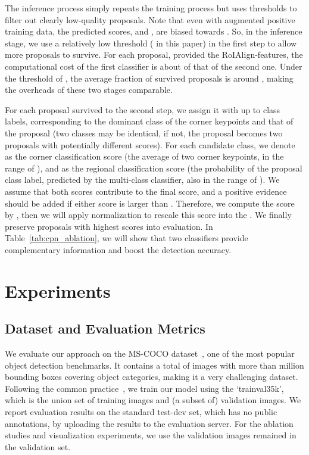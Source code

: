 \documentclass[runningheads]{llncs}
\begin{document}
The inference process simply repeats the training process but uses thresholds to filter out clearly low-quality proposals. Note that even with augmented positive training data, the predicted scores,  and , are biased towards . So, in the inference stage, we use a relatively low threshold ( in this paper) in the first step to allow more proposals to survive. For each proposal, provided the RoIAlign-features, the computational cost of the first classifier is about  of that of the second one. Under the threshold of , the average fraction of survived proposals is around , making the overheads of these two stages comparable.

For each proposal survived to the second step, we assign it with up to  class labels, corresponding to the dominant class of the corner keypoints and that of the proposal (two classes may be identical, if not, the proposal becomes two proposals with potentially different scores). For each candidate class, we denote  
as  the corner classification score (the average of two corner keypoints, in the range of ), and  as the regional classification score (the probability of the proposal class label, predicted by the multi-class classifier, also in the range of ). We assume that both scores contribute to the final score, and a positive evidence should be added if either score is larger than . Therefore, we compute the score by , then we will apply normalization to rescale this score into the . We finally preserve  proposals with highest scores into evaluation. In Table~\ref{tab:cpn_ablation}, we will show that two classifiers provide complementary information and boost the detection accuracy.
\section{Experiments}
\label{Experiments}
\subsection{Dataset and Evaluation Metrics}
\label{Experiments:Dataset}
We evaluate our approach on the MS-COCO dataset~\cite{lin2014microsoft}, one of the most popular object detection benchmarks. It contains a total of  images with more than  million bounding boxes covering  object categories, making it a very challenging dataset. Following the common practice~\cite{lin2017focal,lin2017feature}, we train our model using the `trainval35k', which is the union set of  training images and  (a subset of) validation images. We report evaluation results on the standard test-dev set, which has no public annotations, by uploading the results to the evaluation server. For the ablation studies and visualization experiments, we use the  validation images remained in the validation set.
\end{document}
